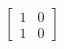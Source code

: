 \documentclass[preview]{standalone}
\begin{document}
\begin{align*}
\begin{bmatrix} 1 &0 \\ 1 & 0\end{bmatrix}
\end{align*}
\end{document}
